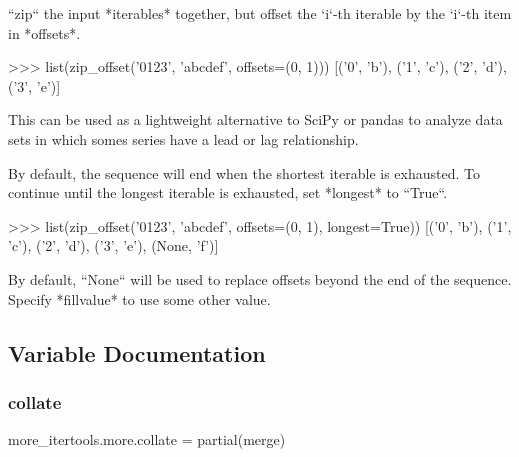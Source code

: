 \begin{DoxyVerb}``zip`` the input *iterables* together, but offset the `i`-th iterable
by the `i`-th item in *offsets*.

    >>> list(zip_offset('0123', 'abcdef', offsets=(0, 1)))
    [('0', 'b'), ('1', 'c'), ('2', 'd'), ('3', 'e')]

This can be used as a lightweight alternative to SciPy or pandas to analyze
data sets in which somes series have a lead or lag relationship.

By default, the sequence will end when the shortest iterable is exhausted.
To continue until the longest iterable is exhausted, set *longest* to
``True``.

    >>> list(zip_offset('0123', 'abcdef', offsets=(0, 1), longest=True))
    [('0', 'b'), ('1', 'c'), ('2', 'd'), ('3', 'e'), (None, 'f')]

By default, ``None`` will be used to replace offsets beyond the end of the
sequence. Specify *fillvalue* to use some other value.\end{DoxyVerb}
 

\subsection{Variable Documentation}
\mbox{\label{namespacemore__itertools_1_1more_a7ca1edc988761eb755402aaa9ee0c5b9}} 
\subsubsection{\texorpdfstring{collate}{collate}}
{\footnotesize\ttfamily more\+\_\+itertools.\+more.\+collate = partial(merge)}

